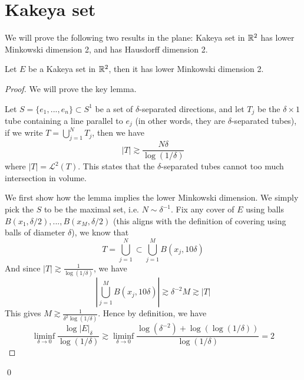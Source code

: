 \chapter{Kakeya set}
We will prove the following two results in the plane: Kakeya set in $\mathbb{R}^2$ has lower Minkowski dimension 2, and has Hausdorff dimension 2. 
\begin{theorem}
    Let $E$ be a Kakeya set in $\mathbb{R}^2$, then it has lower Minkowski dimension 2.
\end{theorem}
\begin{proof}
    We will prove the key lemma.
    \begin{lemma}
        Let $S=\{e_1, ..., e_n\}\subset S^1$ be a set of $\delta$-separated directions, and let $T_j$ be the $\delta\times 1$ tube containing a line parallel to $e_j$ (in other words, they are $\delta$-separated tubes), if we write $T=\bigcup_{j=1}^NT_j$, then we have 
        \begin{equation*}
            |T|\gtrsim \frac{N\delta}{\log(1/\delta)}
        \end{equation*}
        where $|T|=\mathcal{L}^2(T)$. This states that the $\delta$-separated tubes cannot too much intersection in volume.
    \end{lemma}
    We first show how the lemma implies the lower Minkowski dimension. We simply pick the $S$ to be the maximal set, i.e. $N\sim\delta^{-1}$. Fix any cover of $E$ using balls $B(x_1, \delta/2), ..., B(x_M, \delta/2)$ (this aligns with the definition of covering using balls of diameter $\delta$), we know that 
    \begin{equation*}
        T=\bigcup_{j=1}^N\subset \bigcup_{j=1}^M B(x_j,10\delta)
    \end{equation*}
    And since $|T|\gtrsim\frac{1}{\log(1/\delta)}$, we have 
    \begin{equation*}
        \left|\bigcup_{j=1}^M B(x_j, 10\delta)\right|\gtrsim \delta^{-2}M\gtrsim |T|
    \end{equation*}
    This gives $M\gtrsim \frac{1}{\delta^{2}\log(1/\delta)}$. Hence by definition, we have 
    \begin{equation*}
        \liminf_{\delta\to 0}\frac{\log|E|_\delta}{\log(1/\delta)}\gtrsim \liminf_{\delta\to 0}\frac{\log(\delta^{-2})+\log(\log(1/\delta))}{\log(1/\delta)}=2
    \end{equation*}
\end{proof}
\qed

